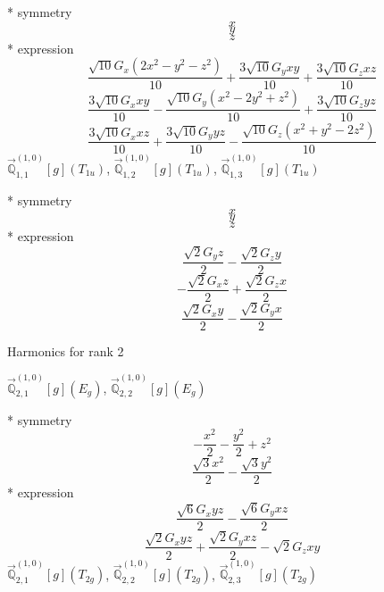 \documentclass[fleqn,8pt]{jsarticle}
\begin{document}
\noindent\quad ** symmetry
\begin{dmath*}
x
\end{dmath*}
\begin{dmath*}
y
\end{dmath*}
\begin{dmath*}
z
\end{dmath*}
\noindent\quad ** expression
\begin{dmath*}
\frac{\sqrt{10} G_{x} \left(2 x^{2} - y^{2} - z^{2}\right)}{10} + \frac{3 \sqrt{10} G_{y} x y}{10} + \frac{3 \sqrt{10} G_{z} x z}{10}
\end{dmath*}
\begin{dmath*}
\frac{3 \sqrt{10} G_{x} x y}{10} - \frac{\sqrt{10} G_{y} \left(x^{2} - 2 y^{2} + z^{2}\right)}{10} + \frac{3 \sqrt{10} G_{z} y z}{10}
\end{dmath*}
\begin{dmath*}
\frac{3 \sqrt{10} G_{x} x z}{10} + \frac{3 \sqrt{10} G_{y} y z}{10} - \frac{\sqrt{10} G_{z} \left(x^{2} + y^{2} - 2 z^{2}\right)}{10}
\end{dmath*}
\noindent\quad $\vec{\mathbb{Q}}_{1,1}^{(1,0)}[g](T_{1u})$, $\vec{\mathbb{Q}}_{1,2}^{(1,0)}[g](T_{1u})$, $\vec{\mathbb{Q}}_{1,3}^{(1,0)}[g](T_{1u})$

\noindent\quad ** symmetry
\begin{dmath*}
x
\end{dmath*}
\begin{dmath*}
y
\end{dmath*}
\begin{dmath*}
z
\end{dmath*}
\noindent\quad ** expression
\begin{dmath*}
\frac{\sqrt{2} G_{y} z}{2} - \frac{\sqrt{2} G_{z} y}{2}
\end{dmath*}
\begin{dmath*}
- \frac{\sqrt{2} G_{x} z}{2} + \frac{\sqrt{2} G_{z} x}{2}
\end{dmath*}
\begin{dmath*}
\frac{\sqrt{2} G_{x} y}{2} - \frac{\sqrt{2} G_{y} x}{2}
\end{dmath*}

\noindent * Harmonics for rank 2

\noindent\quad $\vec{\mathbb{Q}}_{2,1}^{(1,0)}[g](E_{g})$, $\vec{\mathbb{Q}}_{2,2}^{(1,0)}[g](E_{g})$

\noindent\quad ** symmetry
\begin{dmath*}
- \frac{x^{2}}{2} - \frac{y^{2}}{2} + z^{2}
\end{dmath*}
\begin{dmath*}
\frac{\sqrt{3} x^{2}}{2} - \frac{\sqrt{3} y^{2}}{2}
\end{dmath*}
\noindent\quad ** expression
\begin{dmath*}
\frac{\sqrt{6} G_{x} y z}{2} - \frac{\sqrt{6} G_{y} x z}{2}
\end{dmath*}
\begin{dmath*}
\frac{\sqrt{2} G_{x} y z}{2} + \frac{\sqrt{2} G_{y} x z}{2} - \sqrt{2} G_{z} x y
\end{dmath*}
\noindent\quad $\vec{\mathbb{Q}}_{2,1}^{(1,0)}[g](T_{2g})$, $\vec{\mathbb{Q}}_{2,2}^{(1,0)}[g](T_{2g})$, $\vec{\mathbb{Q}}_{2,3}^{(1,0)}[g](T_{2g})$
\end{document}
